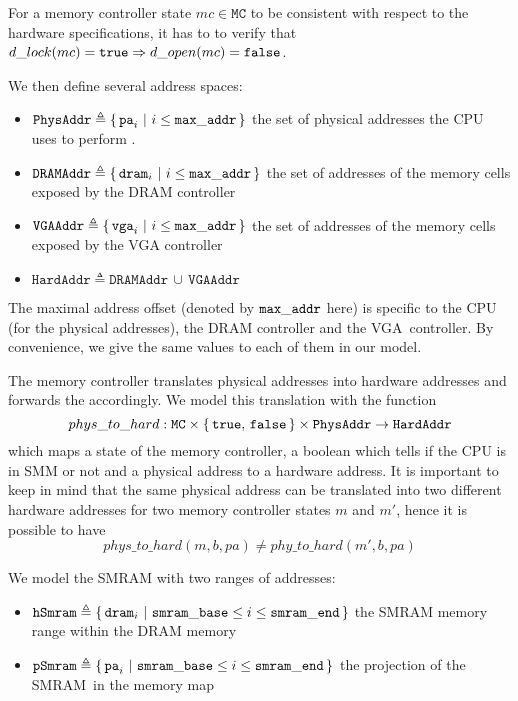 For a memory controller state $mc \in \texttt{MC}$ to be consistent with respect
to the hardware specifications, it has to to verify that $d\_lock(mc) =
\mathtt{true} \Rightarrow d\_open(mc) = \mathtt{false}$.

We then define several address spaces:
\begin{itemize}
  \item $\texttt{PhysAddr} \triangleq \{\,\mathtt{pa}_i\ |\ i \leq
    \mathtt{max\_addr}\,\}$ the set of physical addresses the CPU uses to perform \IO.
  \item $\texttt{DRAMAddr} \triangleq \{\,\mathtt{dram}_i\ |\ i \leq
    \mathtt{max\_addr}\,\}$ the set of addresses of the memory cells exposed by the
    DRAM controller
  \item $\texttt{VGAAddr} \triangleq \{\,\mathtt{vga}_i\ |\ i \leq
    \mathtt{max\_addr}\,\}$ the set of addresses of the memory cells exposed by the
    VGA controller
  \item $\texttt{HardAddr} \triangleq \texttt{DRAMAddr}\,\cup\,\texttt{VGAAddr}$
\end{itemize}

The maximal address offset (denoted by $\mathtt{max\_addr}$ here) is specific to the
CPU (for the physical addresses), the DRAM controller and the VGA controller. By
convenience, we give the same values to each of them in our model.

The memory controller translates physical addresses into hardware addresses and
forwards the \IO accordingly. We model this translation with the function \[
phys\_to\_hard : \texttt{MC} \times \{\,\mathtt{true},\,\mathtt{false}\,\}
\times \texttt{PhysAddr} \rightarrow \texttt{HardAddr} \] which maps a state of
the memory controller, a boolean which tells if the CPU is in SMM or not and a
physical address to a hardware address.  It is important to keep in mind that
the same physical address can be translated into two different hardware
addresses for two memory controller states $m$ and $m'$, hence it is possible to
have \[ phys\_to\_hard(m, b, pa) \neq phy\_to\_hard(m', b, pa) \]

We model the SMRAM with two ranges of addresses:
\begin{itemize}
  \item $\texttt{hSmram} \triangleq \{\,\mathtt{dram}_i\ |\ \mathtt{smram\_base} \leq
    i \le \mathtt{smram\_end}\,\}$ the SMRAM memory range within the DRAM memory
  \item $\texttt{pSmram} \triangleq \{\,\mathtt{pa}_i\ |\ \mathtt{smram\_base} \leq i
    \le \mathtt{smram\_end}\,\}$ the projection of the SMRAM in the memory map
\end{itemize}

